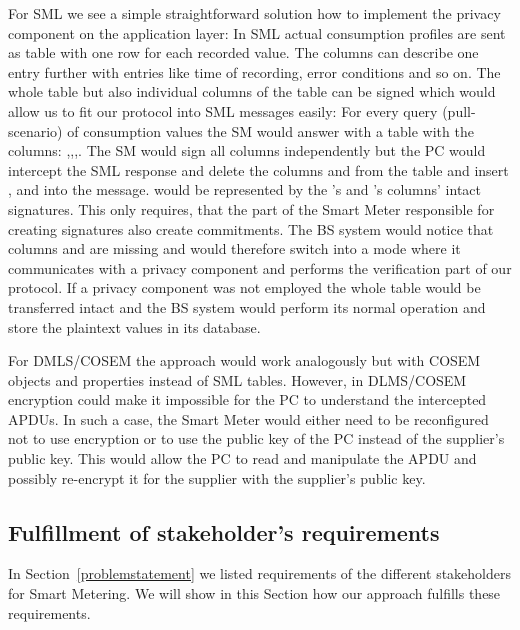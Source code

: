 \documentclass[english]{llncs}
\begin{document}
For SML we see a simple straightforward solution how to implement the privacy component on the application layer:
In SML actual consumption profiles are sent as table with one row for each recorded value. The columns can describe one entry further with entries like time of recording, error conditions and so on. The whole table but also individual columns of the table can be signed which would allow us to fit our protocol into SML messages easily: For every query (pull-scenario) of consumption values the SM would answer with a table with the columns: ,,,. The SM would sign all columns independently but the PC would intercept the SML response and delete the columns  and  from the table and insert , and  into the message.  would be represented by the 's and 's columns' intact signatures. This only requires, that the part of the Smart Meter responsible for creating signatures also create commitments. The BS system would notice that columns  and  are missing and would therefore switch into a mode where it communicates with a privacy component and performs the verification part of our protocol. If a privacy component was not employed the whole table would be transferred intact and the BS system would perform its normal operation and store the plaintext values in its database.
 
For DMLS/COSEM the approach would work analogously but with COSEM objects and properties instead of SML tables. However, in DLMS/COSEM encryption could make it impossible for the PC to understand the intercepted APDUs. In such a case, the Smart Meter would either need to be reconfigured not to use encryption or to use the public key of the PC instead of the supplier's public key.
This would allow the PC to read and manipulate the APDU and possibly re-encrypt it for the supplier with the supplier's public key. 


\subsection{Fulfillment of stakeholder's requirements}
In Section~\ref{problemstatement} we listed requirements of the different stakeholders for Smart Metering.
We will show in this Section how our approach fulfills these requirements.
\end{document}

